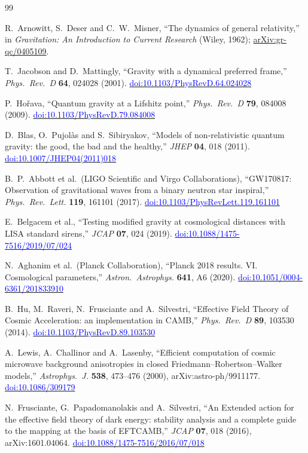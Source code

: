 \documentclass[11pt,a4paper]{article}
\newcommand{\doi}[1]{\href{https://doi.org/#1}{\textcolor{blue}{doi:#1}}}
\begin{document}
\begin{thebibliography}{99}

R.~Arnowitt, S.~Deser and C.~W.~Misner,
``The dynamics of general relativity,''
in \emph{Gravitation: An Introduction to Current Research}
(Wiley, 1962);
\href{https://arxiv.org/abs/gr-qc/0405109}{arXiv:gr-qc/0405109}.

T.~Jacobson and D.~Mattingly,
``Gravity with a dynamical preferred frame,''
\emph{Phys.\ Rev.\ D} \textbf{64}, 024028 (2001).
\doi{10.1103/PhysRevD.64.024028}

P.~Ho\v{r}ava,
``Quantum gravity at a Lifshitz point,''
\emph{Phys.\ Rev.\ D} \textbf{79}, 084008 (2009).
\doi{10.1103/PhysRevD.79.084008}

D.~Blas, O.~Pujol\`as and S.~Sibiryakov,
``Models of non-relativistic quantum gravity: the good, the bad and the healthy,''
\emph{JHEP} \textbf{04}, 018 (2011).
\doi{10.1007/JHEP04(2011)018}

B.~P.~Abbott et al.\ (LIGO Scientific and Virgo Collaborations),
``GW170817: Observation of gravitational waves from a binary neutron star inspiral,''
\emph{Phys.\ Rev.\ Lett.} \textbf{119}, 161101 (2017).
\doi{10.1103/PhysRevLett.119.161101}

E.~Belgacem et al.,
``Testing modified gravity at cosmological distances with LISA standard sirens,''
\emph{JCAP} \textbf{07}, 024 (2019).
\doi{10.1088/1475-7516/2019/07/024}

N.~Aghanim et al.\ (Planck Collaboration),
``Planck 2018 results. VI. Cosmological parameters,''
\emph{Astron.\ Astrophys.} \textbf{641}, A6 (2020).
\doi{10.1051/0004-6361/201833910}

B.~Hu, M.~Raveri, N.~Frusciante and A.~Silvestri,
``Effective Field Theory of Cosmic Acceleration: an implementation in CAMB,''
\emph{Phys.\ Rev.\ D} \textbf{89}, 103530 (2014).
\doi{10.1103/PhysRevD.89.103530}

A.~Lewis, A.~Challinor and A.~Lasenby,
``Efficient computation of cosmic microwave background anisotropies in closed
Friedmann--Robertson--Walker models,''
\emph{Astrophys.\ J.} \textbf{538}, 473--476 (2000), arXiv:astro-ph/9911177.
\doi{10.1086/309179}

N.~Frusciante, G.~Papadomanolakis and A.~Silvestri,
``An Extended action for the effective field theory of dark energy: stability
analysis and a complete guide to the mapping at the basis of EFTCAMB,''
\emph{JCAP} \textbf{07}, 018 (2016), arXiv:1601.04064.
\doi{10.1088/1475-7516/2016/07/018}


\end{thebibliography}
\end{document}
